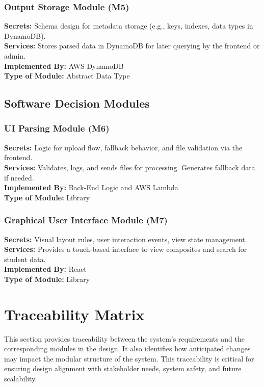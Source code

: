 \documentclass[12pt, titlepage]{article}
\begin{document}
\subsubsection{Output Storage Module (M5)}
\textbf{Secrets:} Schema design for metadata storage (e.g., keys, indexes, data types in DynamoDB). \\
\textbf{Services:} Stores parsed data in DynamoDB for later querying by the frontend or admin. \\
\textbf{Implemented By:} AWS DynamoDB \\
\textbf{Type of Module:} Abstract Data Type

\subsection{Software Decision Modules}

\subsubsection{UI Parsing Module (M6)}
\textbf{Secrets:} Logic for upload flow, fallback behavior, and file validation via the frontend. \\
\textbf{Services:} Validates, logs, and sends files for processing. Generates fallback data if needed. \\
\textbf{Implemented By:} Back-End Logic and AWS Lambda \\
\textbf{Type of Module:} Library

\subsubsection{Graphical User Interface Module (M7)}
\textbf{Secrets:} Visual layout rules, user interaction events, view state management. \\
\textbf{Services:} Provides a touch-based interface to view composites and search for student data. \\
\textbf{Implemented By:} React \\
\textbf{Type of Module:} Library

\section{Traceability Matrix}
\label{SecTM}
This section provides traceability between the system’s requirements and the corresponding modules in the design. It also identifies how anticipated changes may impact the modular structure of the system. This traceability is critical for ensuring design alignment with stakeholder needs, system safety, and future scalability.
\end{document}
